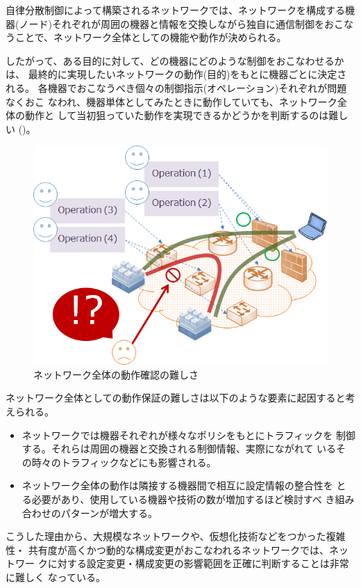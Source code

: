 自律分散制御によって構築されるネットワークでは、ネットワークを構成する機
器(ノード)それぞれが周囲の機器と情報を交換しながら独自に通信制御をおこな
うことで、ネットワーク全体としての機能や動作が決められる。

したがって、ある目的に対して、どの機器にどのような制御をおこなわせるかは、
最終的に実現したいネットワークの動作(目的)をもとに機器ごとに決定される。
各機器でおこなうべき個々の制御指示(オペレーション)それぞれが問題なくおこ
なわれ、機器単体としてみたときに動作していても、ネットワーク全体の動作と
して当初狙っていた動作を実現できるかどうかを判断するのは難しい
()。

 \begin{figure}[h]
  \centering
  \includegraphics[scale=0.6]{img/difficulty-of-network-operation.png}
  \caption{ネットワーク全体の動作確認の難しさ}
  \label{fig:difficulty-of-network-operation}
 \end{figure}

ネットワーク全体としての動作保証の難しさは以下のような要素に起因すると考
えられる。
\begin{itemize}
 \item ネットワークでは機器それぞれが様々なポリシをもとにトラフィックを
       制御する。それらは周囲の機器と交換される制御情報、実際にながれて
       いるその時々のトラフィックなどにも影響される。
 \item ネットワーク全体の動作は隣接する機器間で相互に設定情報の整合性を
       とる必要があり、使用している機器や技術の数が増加するほど検討すべ
       き組み合わせのパターンが増大する。
\end{itemize}
こうした理由から、大規模なネットワークや、仮想化技術などをつかった複雑性・
共有度が高くかつ動的な構成変更がおこなわれるネットワークでは、ネットワー
クに対する設定変更・構成変更の影響範囲を正確に判断することは非常に難しく
なっている。

